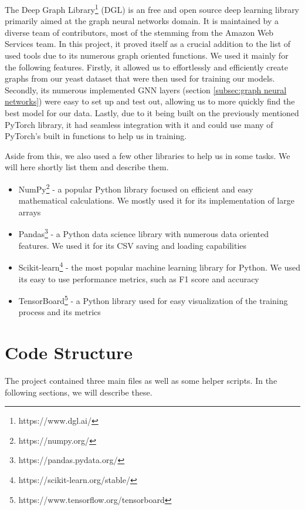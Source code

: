 \documentclass[times, utf8, diplomski, english]{fer_eng}
\begin{document}
The Deep Graph Library\footnote{https://www.dgl.ai/} (DGL) \cite{DGL} is an free and open source deep learning library primarily aimed at the graph neural networks domain. It is maintained by a diverse team of contributors, most of the stemming from the Amazon Web Services team. In this project, it proved itself as a crucial addition to the list of used tools due to its numerous graph oriented functions. We used it mainly for the following features. Firstly, it allowed us to effortlessly and efficiently create graphs from our yeast dataset that were then used for training our models. Secondly, its numerous implemented GNN layers (section \ref{subsec:graph neural networks}) were easy to set up and test out, allowing us to more quickly find the best model for our data. Lastly, due to it being built on the previously mentioned PyTorch library, it had seamless integration with it and could use many of PyTorch's built in functions to help us in training.

Aside from this, we also used a few other libraries to help us in some tasks. We will here shortly list them and describe them.

\begin{itemize}
	\item NumPy\footnote{https://numpy.org/} - a popular Python library focused on efficient and easy mathematical calculations. We mostly used it for its implementation of large arrays

	\item Pandas\footnote{https://pandas.pydata.org/} - a Python data science library with numerous data oriented features. We used it for its CSV saving and loading capabilities

	\item Scikit-learn\footnote{https://scikit-learn.org/stable/} - the most popular machine learning library for Python. We used its easy to use performance metrics, such as F1 score and accuracy

	\item TensorBoard\footnote{https://www.tensorflow.org/tensorboard} - a Python library used for easy visualization of the training process and its metrics
\end{itemize}

\section{Code Structure}
\label{sec:code structure}

The project contained three main files as well as some helper scripts. In the following sections, we will describe these.
\end{document}
